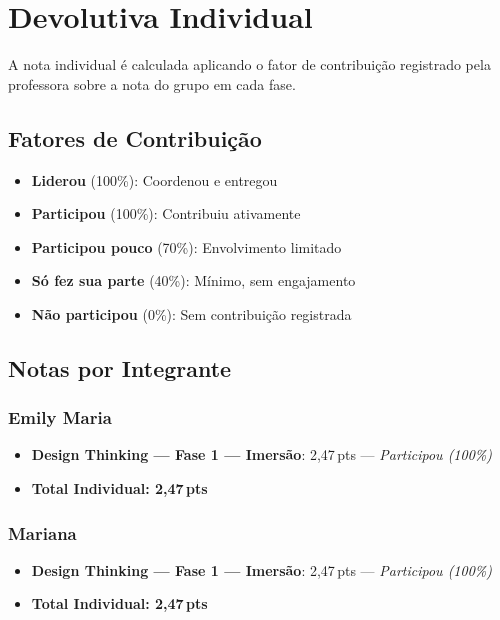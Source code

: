 \documentclass[
  sigconf,
  language=portuguese
]{acmart}
\begin{document}
\section{Devolutiva Individual}

A nota individual é calculada aplicando o fator de contribuição registrado pela professora sobre a nota do grupo em cada fase.

\subsection{Fatores de Contribuição}

\begin{itemize}[leftmargin=14pt,itemsep=1pt,topsep=3pt]
  \item \textbf{Liderou} (100\%): Coordenou e entregou
  \item \textbf{Participou} (100\%): Contribuiu ativamente
  \item \textbf{Participou pouco} (70\%): Envolvimento limitado
  \item \textbf{Só fez sua parte} (40\%): Mínimo, sem engajamento
  \item \textbf{Não participou} (0\%): Sem contribuição registrada
\end{itemize}

\subsection{Notas por Integrante}

\subsubsection*{Emily Maria}

\begin{itemize}[leftmargin=14pt,itemsep=2pt,topsep=3pt,parsep=0pt]
  \item \textbf{Design Thinking — Fase 1 — Imersão}: 2,47\,pts — \textit{Participou (100\%)}

  \item[\textbf{=}] \textbf{Total Individual: 2,47\,pts}
\end{itemize}

\subsubsection*{Mariana}

\begin{itemize}[leftmargin=14pt,itemsep=2pt,topsep=3pt,parsep=0pt]
  \item \textbf{Design Thinking — Fase 1 — Imersão}: 2,47\,pts — \textit{Participou (100\%)}

  \item[\textbf{=}] \textbf{Total Individual: 2,47\,pts}
\end{itemize}
\end{document}
